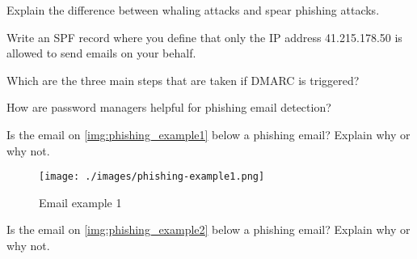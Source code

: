 \begin{question}[Question]
    Explain the difference between whaling attacks and spear phishing attacks. 
\end{question}
\begin{question}[Answer]
    \vspace{3cm}
\end{question}

\begin{question}[Question]
    Write an SPF record where you define that only the IP address 41.215.178.50 is allowed to send emails on your behalf.
\end{question}
\begin{question}[Answer]
    \vspace{3cm}
\end{question}

\begin{question}[Question]
    Which are the three main steps that are taken if DMARC is triggered?
\end{question}
\begin{question}[Answer]
    \vspace{3cm}
\end{question}

\begin{question}[Question]
    How are password managers helpful for phishing email detection?
\end{question}
\begin{question}[Answer]
    \vspace{3cm}
\end{question}

\newpage
\begin{question}[Question]
    Is the email on \autoref{img:phishing_example1} below a phishing email? Explain why or why not.
\end{question}
\begin{question}[Answer]
    \vspace{3cm}
\end{question}

\begin{figure}[h!p]
    \centering
    \texttt{[image: ./images/phishing-example1.png]}
    \caption{Email example 1}
    \label{img:phishing_example1}
\end{figure}

\newpage
\begin{question}[Question]
    Is the email on \autoref{img:phishing_example2} below a phishing email? Explain why or why not.
\end{question}
\begin{question}[Answer]
    \vspace{3cm}
\end{question}

